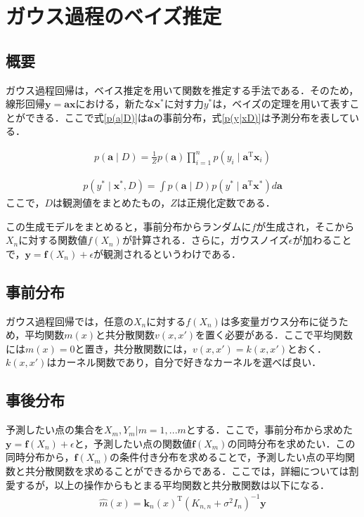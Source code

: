 \documentclass[10pt,onecolumn]{jsarticle}
\begin{document}
\section{ガウス過程のベイズ推定}
	\subsection{概要}
	ガウス過程回帰は，ベイス推定を用いて関数を推定する手法である．そのため，線形回帰$\bm{y} = \bm{a}\bm{x}$における，新たな$\bm{x^*}$に対す力$y^*$は，ベイズの定理を用いて表すことができる．ここで式\eqref{p(a|D)}は$\bm{a}$の事前分布，式\eqref{p(y|xD)}は予測分布を表している．

	\begin{align}
		p(\boldsymbol{a} \mid D)=\frac{1}{Z} p(\boldsymbol{a}) \prod_{i=1}^{n} p\left(y_{i} \mid \boldsymbol{a}^{\mathrm{T}} \boldsymbol{x}_{i}\right)
		\label{p(a|D)}
	\end{align}

	\begin{align}
		p\left(y^{*} \mid \boldsymbol{x}^{*}, D\right)=\int p(\boldsymbol{a} \mid D) p\left(y^{*} \mid \boldsymbol{a}^{\mathrm{T}} \boldsymbol{x}^{*}\right) d \boldsymbol{a}
		\label{p(y|xD)}
	\end{align}
	ここで，$D$は観測値をまとめたもの，$Z$は正規化定数である．

	この生成モデルをまとめると，事前分布からランダムに$f$が生成され，そこから$X_n$に対する関数値$f(X_n)$が計算される．さらに，ガウスノイズ$\epsilon$が加わることで，$\bm{y} = \bm{f}(X_n) + \epsilon$が観測されるというわけである．
	\subsection{事前分布}
	ガウス過程回帰では，任意の$X_n$に対する$f(X_n)$は多変量ガウス分布に従うため，平均関数$m(x)$と共分散関数$v(x,x')$を置く必要がある．ここで平均関数には$m(x)=0$と置き，共分散関数には，$v(x,x') = k(x,x')$とおく．$k(x,x')$はカーネル関数であり，自分で好きなカーネルを選べば良い．
	\subsection{事後分布}
	予測したい点の集合を${X_m,Y_m|m=1,...m}$とする．ここで，事前分布から求めた$\bm{y} = \bm{f}(X_n) + \epsilon$と，予測したい点の関数値$\bm{f}(X_m)$の同時分布を求めたい．この同時分布から，$\bm{f}(X_m)$の条件付き分布を求めることで，予測したい点の平均関数と共分散関数を求めることができるからである．ここでは，詳細については割愛するが，以上の操作からもとまる平均関数と共分散関数は以下になる．
	\begin{align}
		\hat{m}(x)=\boldsymbol{k}_{n}(x)^{\mathrm{T}}\left(K_{n, n}+\sigma^{2} I_{n}\right)^{-1} \boldsymbol{y}
	\end{align}
\end{document}
